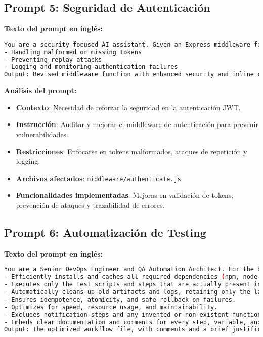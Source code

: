 \documentclass[12pt,a4paper]{article}
\begin{document}
\subsection{Prompt 5: Seguridad de Autenticación}

\textbf{Texto del prompt en inglés:}
\begin{lstlisting}[language=bash]
You are a security-focused AI assistant. Given an Express middleware for Firebase JWT authentication, audita el código para vulnerabilidades incluyendo extracción de token, verificación y manejo de errores. Sugiere mejoras para:
- Handling malformed or missing tokens
- Preventing replay attacks
- Logging and monitoring authentication failures
Output: Revised middleware function with enhanced security and inline comments.
\end{lstlisting}

\textbf{Análisis del prompt:}
\begin{itemize}
    \item \textbf{Contexto}: Necesidad de reforzar la seguridad en la autenticación JWT.
    \item \textbf{Instrucción}: Auditar y mejorar el middleware de autenticación para prevenir vulnerabilidades.
    \item \textbf{Restricciones}: Enfocarse en tokens malformados, ataques de repetición y logging.
    \item \textbf{Archivos afectados}: \texttt{middleware/authenticate.js}
    \item \textbf{Funcionalidades implementadas}: Mejoras en validación de tokens, prevención de ataques y trazabilidad de errores.
\end{itemize}

\subsection{Prompt 6: Automatización de Testing}

\textbf{Texto del prompt en inglés:}
\begin{lstlisting}[language=bash]
You are a Senior DevOps Engineer and QA Automation Architect. For the backend-v1 project, design and implement a GitHub Actions CI/CD workflow that:
- Efficiently installs and caches all required dependencies (npm, node_modules, testing tools).
- Executes only the test scripts and steps that are actually present in the project (unit, integration, coverage).
- Automatically cleans up old artifacts and logs, retaining only the last 14 days.
- Ensures idempotence, atomicity, and safe rollback on failures.
- Optimizes for speed, resource usage, and maintainability.
- Excludes notification steps and any invented or non-existent functionality.
- Embeds clear documentation and comments for every step, variable, and condition.
Output: The optimized workflow file, with comments and a brief justification for each improvement implemented.
\end{lstlisting}
\end{document}
